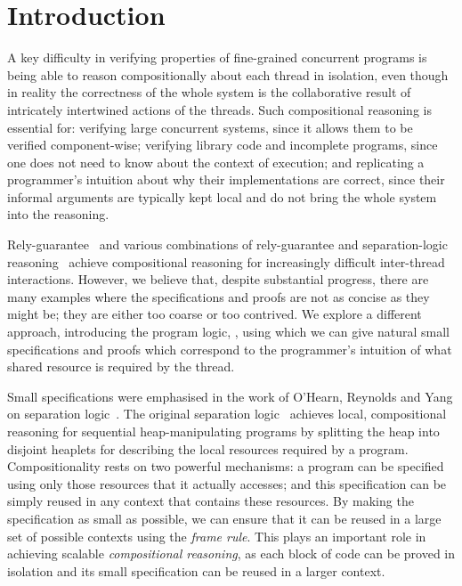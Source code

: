 \section{Introduction}
\label{sec:introduction}



A key difficulty in verifying properties of fine-grained concurrent
programs is being able to reason compositionally about each thread in
isolation, even though in reality the correctness of the whole system
is the collaborative result of intricately intertwined actions of the
threads.  Such compositional reasoning is essential for: verifying
large concurrent systems, since it allows them to be verified
component-wise;  verifying library code and incomplete programs,
since one does not need to know about the context of execution; and 
replicating a programmer's intuition about why their implementations
are correct, since their informal arguments are typically  kept local and do
not bring the whole system into the reasoning.


Rely-guarantee~\cite{rg} and various combinations of
rely-guarantee and separation-logic
reasoning~\cite{viktor-marriage,dg,lrg,cap-ecoop10,icap,tada} achieve
compositional reasoning for increasingly difficult inter-thread
interactions. However, we believe that, despite substantial progress, there are many
examples where the specifications and proofs are not as concise as
they might be; they  are either too coarse or
too 
contrived. 
We explore a different approach, introducing the
program logic, \colosl, using which we can give natural small
specifications and proofs which correspond to the  programmer's intuition of what shared
resource
is required by the thread. 




Small specifications were emphasised in the work of O'Hearn, Reynolds
and Yang on separation logic~\cite{o2001local}.  The original
separation logic~\cite{rey02,seplog} achieves local, compositional reasoning
for sequential heap-manipulating programs by splitting the heap into
disjoint heaplets for describing the local resources required by a
program. Compositionality rests on two powerful mechanisms: a program
can be specified using only those resources that it actually accesses;
and this specification can be simply reused in any context that
contains these resources.  By making the specification as small as
possible, we can ensure that it can be reused in a large set of
possible contexts using the {\em frame rule}. This plays an important
role in achieving scalable \emph{compositional reasoning}, as each
block of code can be proved in isolation and its small specification
can be reused in a larger context.


